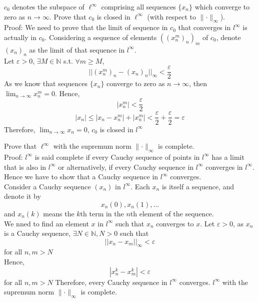 \documentclass [12pt,letterpaper]{exam}
\begin{document}
\begin{questions}
\question %
$c_0$ denotes the subspace of $\ell^{\infty}$ comprising all sequences $\{ x_n\}$ which converge to zero as $n\to\infty$.
Prove that $c_0$ is closed in $\ell^{\infty}$ (with respect to $\lVert\cdot\rVert_{\infty}$).\\

Proof: We need to prove that the limit of sequence in $c_0$ that converges in $l^\infty$ is actually in $c_0$. Considering a sequence of elements $((x_{n}^{m})_n)_m$ of $c_0$, denote $(x_n)_n$ as the limit of that sequence in $l^\infty$.\\
Let $\varepsilon > 0$, $\exists M \in \mathbb{N}$ s.t. $\forall m \geq M$, 
$$||(x_{n}^{m})_{n} - (x_n)_n||_{\infty} < \frac{\varepsilon}{2}$$
As we know that sequences $\big\{ x_n \big\}$ converge to zero as $n \rightarrow \infty$, then $\lim_{n \rightarrow \infty}x_{n}^{m} = 0$. Hence, $$|x_{n}^{m}| < \frac{\varepsilon}{2}$$
$$|x_n| \leq |x_n - x_{n}^{m}| + |x_{n}^{m}| < \frac{\varepsilon}{2} + \frac{\varepsilon}{2} = \varepsilon$$
Therefore, $\lim_{n \rightarrow \infty}x_n = 0$, $c_0$ is closed in $l^\infty$

\question %
Prove that $\ell^{\infty}$ with the supremum norm $\lVert\cdot\rVert_{\infty}$ is complete.\\

Proof: $l^\infty$ is said complete if every Cauchy sequence of points in $l^\infty$ has a limit that is also in $l^{\infty}$ or alternatively, if every Cauchy sequence in $l^\infty$ converges in $l^\infty$. Hence we have to show that a Cauchy sequence in $l^\infty$ converges.\\
Consider a Cauchy sequence $(x_n)$ in $l^\infty$. Each $x_n$ is itself a sequence, and denote it by $$x_n(0), x_n(1),...$$
and $x_n(k)$ means the $k$th term in the $n$th element of the sequence.\\
We nned to find an element $x$ in $l^\infty$ such that $x_n$ converges to $x$.
Let $\varepsilon > 0$, as $x_n$ is a Cauchy sequence, $\exists N \in \mathbb{N}, N > 0$ such that $$||x_n - x_m||_\infty < \varepsilon$$
for all $n, m > N$\\
Hence, $$|x_{n}^{k} - x_{m}^{k}| < \varepsilon$$
for all $n, m > N$
Therefore, every Cauchy sequence in $l^\infty$ converges. $l^\infty$ with the supremum norm $\lVert\cdot\rVert_{\infty}$ is complete.


\end{questions}
\end{document}
